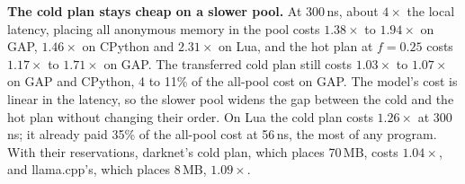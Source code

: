 \documentclass[11pt]{article}
\begin{document}
\begin{table}[t]
\centering
\footnotesize
\caption{A slower pool: run time with all anonymous memory in the pool or with the transferred cold or hot plan at
$f = 0.25$ over the run with all memory local ($\times$, median of 5 runs), for the pool's added latency over local
memory of 56\,ns (node 1 idle) and 107\,ns (node 1 busy), measured, and of 200 and 300\,ns, about $3\times$ and
$4\times$ the local latency, predicted. darknet and llama.cpp run with their reservations, over the reservations
alone. Error: the largest difference between the predicted and the measured slowdown at 107\,ns.}
\label{tab:place-cxl}
\setlength{\tabcolsep}{2.6pt}

\end{table}

\textbf{The cold plan stays cheap on a slower pool.} At 300\,ns, about $4\times$ the local latency, placing all
anonymous memory in the pool costs $1.38\times$ to $1.94\times$ on GAP, $1.46\times$ on CPython and $2.31\times$ on Lua,
and the hot plan at $f = 0.25$ costs $1.17\times$ to $1.71\times$ on GAP. The transferred cold plan still costs
$1.03\times$ to $1.07\times$ on GAP and CPython, 4 to 11\% of the all-pool cost on GAP. The model's cost is linear in the
latency, so the slower pool widens the gap between the cold and the hot plan without changing their order. On Lua the
cold plan costs $1.26\times$ at 300\,ns; it already paid 35\% of the all-pool cost at 56\,ns, the most of any program.
With their reservations, darknet's cold plan, which places 70\,MB, costs $1.04\times$, and llama.cpp's, which places
8\,MB, $1.09\times$.
\end{document}
